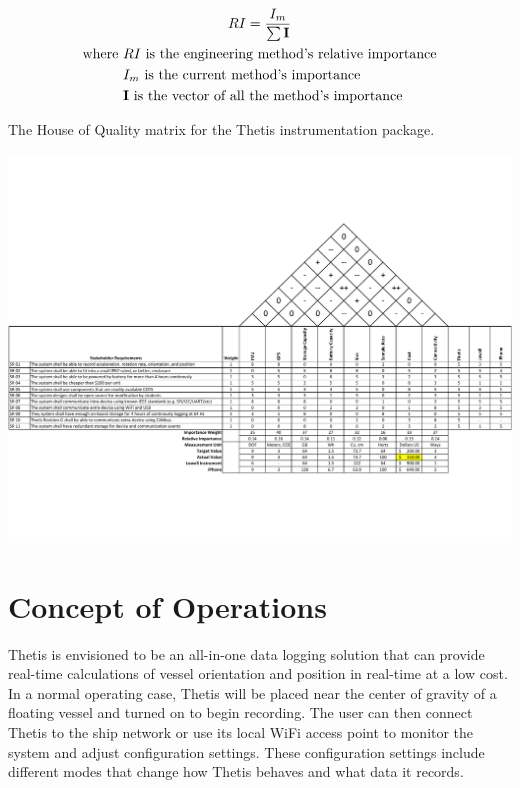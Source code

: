 \begin{gather}
	\label{eq:hoq_rel_importance}
	RI = \frac{I_m}{\sum{\textbf{I}}} \\
	\begin{aligned}
		\text{where } &RI \text{ is the engineering method's relative importance} \\
					  &I_m \text{ is the current method's importance} \\
					  &\textbf{I} \text{ is the vector of all the method's importance} \\
	\end{aligned} \notag
\end{gather}

\begin{landscape}
	\begin{table}
		\caption[House of Quality]{The House of Quality matrix for the Thetis instrumentation package.}
		\label{tab:hoq}
		\includegraphics[height=\textwidth-24pt]{../include/ThetisHOQ.pdf}
	\end{table}
\end{landscape}

\section{Concept of Operations} \label{sec:conops}
Thetis is envisioned to be an all-in-one data logging solution that can provide real-time calculations of vessel orientation and position in real-time at a low cost.
In a normal operating case, Thetis will be placed near the center of gravity of a floating vessel and turned on to begin recording.
The user can then connect Thetis to the ship network or use its local WiFi access point to monitor the system and adjust configuration settings.
These configuration settings include different modes that change how Thetis behaves and what data it records.

